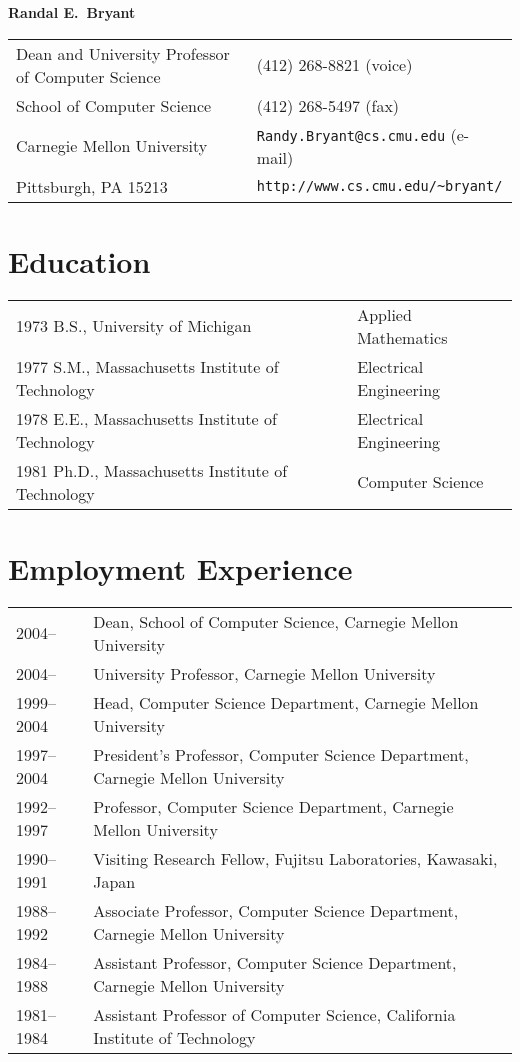 \documentclass{article}
\begin{document}
\begin{center}
{\large\bf Randal E.~Bryant}
\end{center}

\begin{flushleft}
\begin{tabular}{p{3.75in}l}
Dean and University Professor of Computer Science      & (412) 268-8821 (voice)\\
School of Computer Science & (412) 268-5497 (fax)\\
Carnegie Mellon University            & {\tt Randy.Bryant@cs.cmu.edu} (e-mail)\\
Pittsburgh, PA 15213     & \verb+http://www.cs.cmu.edu/~bryant/+\\
\end{tabular}
\end{flushleft}

\section*{Education}

\begin{tabular}{ll}
1973 B.S., University of Michigan & Applied Mathematics\\
1977 S.M., Massachusetts Institute of Technology & Electrical Engineering\\
1978 E.E., Massachusetts Institute of Technology & Electrical Engineering\\
1981 Ph.D., Massachusetts Institute of Technology & Computer Science\\
\end{tabular}

\section*{Employment Experience}

\begin{tabular}{ll}
2004-- & Dean, School of Computer Science, Carnegie Mellon University\\
2004-- & University Professor, Carnegie Mellon University\\
1999--2004 & Head, Computer Science Department, Carnegie Mellon University\\
1997--2004 & President's Professor, Computer Science Department, Carnegie Mellon University \\
1992--1997 & Professor, Computer Science Department, Carnegie Mellon University \\
1990--1991 & Visiting Research Fellow, Fujitsu Laboratories, Kawasaki, Japan \\
1988--1992 & Associate Professor, Computer Science Department, Carnegie Mellon University \\
1984--1988 & Assistant Professor, Computer Science Department, Carnegie Mellon University \\
1981--1984 & Assistant Professor of Computer Science, California Institute of Technology\\
\end{tabular}
\end{document}
